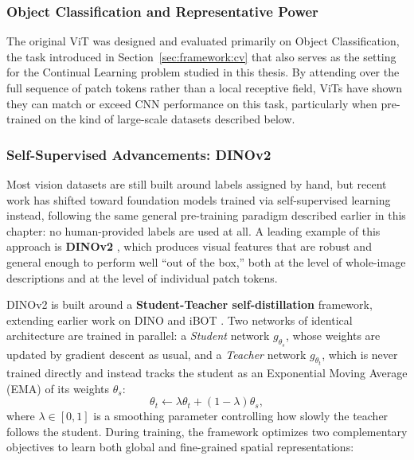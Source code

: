 \subsubsection{Object Classification and Representative Power}
The original ViT was designed and evaluated primarily on Object Classification, the task introduced in Section~\ref{sec:framework:cv} that also serves as the setting for the Continual Learning problem studied in this thesis. By attending over the full sequence of patch tokens rather than a local receptive field, ViTs have shown they can match or exceed CNN performance on this task, particularly when pre-trained on the kind of large-scale datasets described below.

\subsubsection{Self-Supervised Advancements: DINOv2}

Most vision datasets are still built around labels assigned by hand, but recent work has shifted toward foundation models trained via self-supervised learning instead, following the same general pre-training paradigm described earlier in this chapter: no human-provided labels are used at all. A leading example of this approach is \textbf{DINOv2} \cite{oquab2024dinov}, which produces visual features that are robust and general enough to perform well ``out of the box,'' both at the level of whole-image descriptions and at the level of individual patch tokens.

DINOv2 is built around a \textbf{Student-Teacher self-distillation} framework, extending earlier work on DINO \cite{DINO} and iBOT \cite{ibot}. Two networks of identical architecture are trained in parallel: a \textit{Student} network $g_{\theta_s}$, whose weights are updated by gradient descent as usual, and a \textit{Teacher} network $g_{\theta_t}$, which is never trained directly and instead tracks the student as an Exponential Moving Average (EMA) of its weights $\theta_s$:
\begin{equation}
	\theta_t \leftarrow \lambda \theta_t + (1 - \lambda) \theta_s,
\end{equation}
where $\lambda \in [0, 1]$ is a smoothing parameter controlling how slowly the teacher follows the student. During training, the framework optimizes two complementary objectives to learn both global and fine-grained spatial representations:

